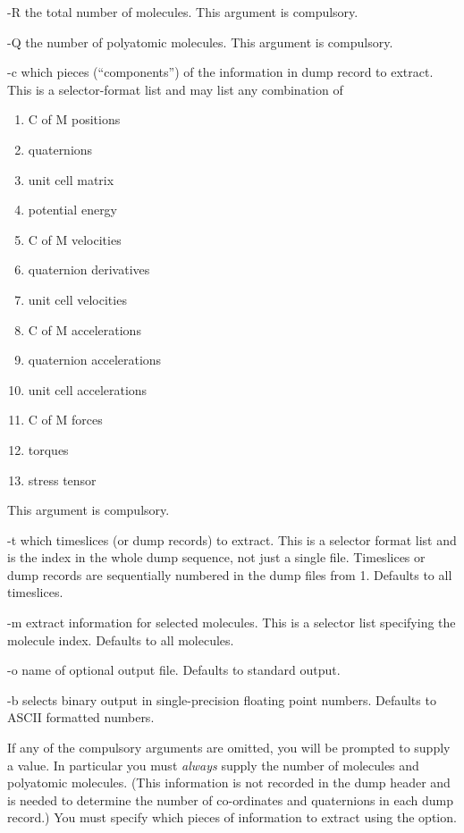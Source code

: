 \documentclass[a4paper,twoside]{report}
\begin{document}
\begin{list}{}{\let\makelabel\ttlabel\itemsep=0pt\parsep=3pt\leftmargin=1.5cm}
\item[-R] the total number of molecules.  This argument is compulsory.
\item[-Q] the number of polyatomic molecules.  This argument is compulsory.
\item[-c] which pieces (``components'') of the information in dump
record to extract.  This is a selector-format list and may list any
combination of
\begin{enumerate}
\itemsep=0pt
\parskip=0pt
\item C of M positions
\item quaternions
\item unit cell matrix
\item potential energy
\item C of M velocities
\item quaternion derivatives
\item unit cell velocities
\item C of M accelerations
\item quaternion accelerations
\item unit cell accelerations
\item C of M forces
\item torques
\item stress tensor
\end{enumerate}
This argument is compulsory.
\item[-t] which timeslices (or dump records) to extract.  This is a
selector format list and is the index in the whole dump sequence, not
just a single file.  Timeslices or dump records are sequentially
numbered in the dump files from 1.  Defaults to all timeslices.
\item[-m] extract information for selected molecules.  This is a
selector list specifying the molecule index.  Defaults to all
molecules.
\item[-o] name of optional output file.  Defaults to standard output.
\item[-b] selects binary output in single-precision floating point
numbers. Defaults to ASCII formatted numbers.
\end{list}
If any of the compulsory arguments are omitted, you will be prompted
to supply a value.  In particular you must \emph{always} supply the
number of molecules and polyatomic molecules.  (This information is
not recorded in the dump header and is needed to determine the number
of co-ordinates and quaternions in each dump record.)  You must
specify which pieces of information to extract using the 
option.
\end{document}
